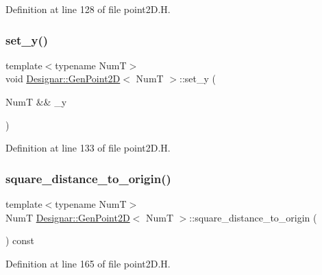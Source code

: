 Definition at line 128 of file point2\+D.\+H.

\mbox{\label{class_designar_1_1_gen_point2_d_af82a367767d79081e2afe1228fcf2bc6}} 
\subsubsection{\texorpdfstring{set\+\_\+y()}{set\_y()}}
{\footnotesize\ttfamily template$<$typename NumT$>$ \\
void \hyperlink{class_designar_1_1_gen_point2_d}{Designar\+::\+Gen\+Point2D}$<$ NumT $>$\+::set\+\_\+y (\begin{DoxyParamCaption}\item[{NumT \&\&}]{\+\_\+y }\end{DoxyParamCaption})\hspace{0.3cm}{\ttfamily [inline]}}



Definition at line 133 of file point2\+D.\+H.

\mbox{\label{class_designar_1_1_gen_point2_d_adda120357e8a76bd42b7cd9517cecaad}} 
\subsubsection{\texorpdfstring{square\+\_\+distance\+\_\+to\+\_\+origin()}{square\_distance\_to\_origin()}}
{\footnotesize\ttfamily template$<$typename NumT$>$ \\
NumT \hyperlink{class_designar_1_1_gen_point2_d}{Designar\+::\+Gen\+Point2D}$<$ NumT $>$\+::square\+\_\+distance\+\_\+to\+\_\+origin (\begin{DoxyParamCaption}{ }\end{DoxyParamCaption}) const\hspace{0.3cm}{\ttfamily [inline]}}



Definition at line 165 of file point2\+D.\+H.

